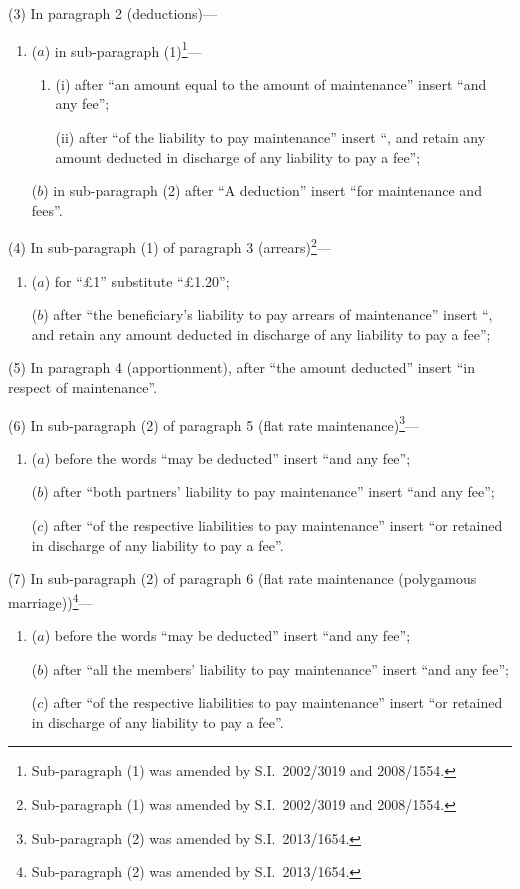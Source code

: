 \documentclass[12pt,a4paper]{article}
\begin{document}
(3) In paragraph 2 (deductions)—
\begin{enumerate}\item[]
($a$) in sub-paragraph (1)\footnote{Sub-paragraph (1) was amended by S.I.~2002/3019 and 2008/1554.}—
\begin{enumerate}\item[]
(i) after “an amount equal to the amount of maintenance” insert “and any fee”;

(ii) after “of the liability to pay maintenance” insert “, and retain any amount deducted in discharge of any liability to pay a fee”;
\end{enumerate}

($b$) in sub-paragraph (2) after “A deduction” insert “for maintenance and fees”.
\end{enumerate}

(4) In sub-paragraph (1) of paragraph 3 (arrears)\footnote{Sub-paragraph (1) was amended by S.I.~2002/3019 and 2008/1554.}—
\begin{enumerate}\item[]
($a$) for ``£1'' substitute “£1$.$20”;

($b$) after “the beneficiary’s liability to pay arrears of maintenance” insert “, and retain any amount deducted in discharge of any liability to pay a fee”;
\end{enumerate}

(5) In paragraph 4 (apportionment), after “the amount deducted” insert “in respect of maintenance”.

(6) In sub-paragraph (2) of paragraph 5 (flat rate maintenance)\footnote{Sub-paragraph (2) was amended by S.I.~2013/1654.}—
\begin{enumerate}\item[]
($a$) before the words “may be deducted” insert “and any fee”;

($b$) after “both partners’ liability to pay maintenance” insert “and any fee”;

($c$) after “of the respective liabilities to pay maintenance” insert “or retained in discharge of any liability to pay a fee”.
\end{enumerate}

(7) In sub-paragraph (2) of paragraph 6 (flat rate maintenance (polygamous marriage))\footnote{Sub-paragraph (2) was amended by S.I.~2013/1654.}—
\begin{enumerate}\item[]
($a$) before the words “may be deducted” insert “and any fee”;

($b$) after “all the members’ liability to pay maintenance” insert “and any fee”;

($c$) after “of the respective liabilities to pay maintenance” insert “or retained in discharge of any liability to pay a fee”.
\end{enumerate}
\end{document}

